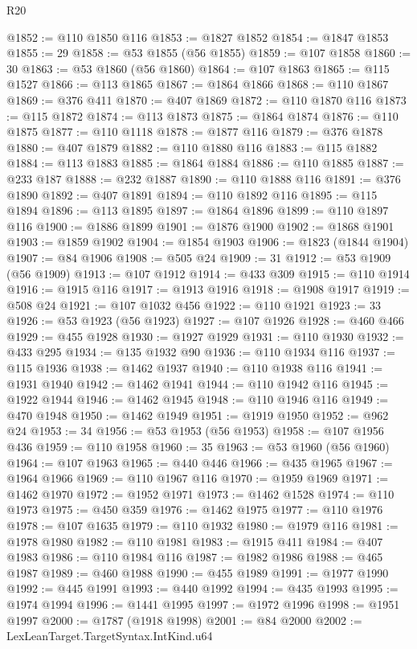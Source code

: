 \begin{lexlean}{R20}
\begin{coremodule}
@1852 := @110 @1850 @116
@1853 := @1827 @1852
@1854 := @1847 @1853
@1855 := 29
@1858 := @53 @1855 (@56 @1855)
@1859 := @107 @1858
@1860 := 30
@1863 := @53 @1860 (@56 @1860)
@1864 := @107 @1863
@1865 := @115 @1527
@1866 := @113 @1865
@1867 := @1864 @1866
@1868 := @110 @1867
@1869 := @376 @411
@1870 := @407 @1869
@1872 := @110 @1870 @116
@1873 := @115 @1872
@1874 := @113 @1873
@1875 := @1864 @1874
@1876 := @110 @1875
@1877 := @110 @1118
@1878 := @1877 @116
@1879 := @376 @1878
@1880 := @407 @1879
@1882 := @110 @1880 @116
@1883 := @115 @1882
@1884 := @113 @1883
@1885 := @1864 @1884
@1886 := @110 @1885
@1887 := @233 @187
@1888 := @232 @1887
@1890 := @110 @1888 @116
@1891 := @376 @1890
@1892 := @407 @1891
@1894 := @110 @1892 @116
@1895 := @115 @1894
@1896 := @113 @1895
@1897 := @1864 @1896
@1899 := @110 @1897 @116
@1900 := @1886 @1899
@1901 := @1876 @1900
@1902 := @1868 @1901
@1903 := @1859 @1902
@1904 := @1854 @1903
@1906 := @1823 (@1844 @1904)
@1907 := @84 @1906
@1908 := @505 @24
@1909 := 31
@1912 := @53 @1909 (@56 @1909)
@1913 := @107 @1912
@1914 := @433 @309
@1915 := @110 @1914
@1916 := @1915 @116
@1917 := @1913 @1916
@1918 := @1908 @1917
@1919 := @508 @24
@1921 := @107 @1032 @456
@1922 := @110 @1921
@1923 := 33
@1926 := @53 @1923 (@56 @1923)
@1927 := @107 @1926
@1928 := @460 @466
@1929 := @455 @1928
@1930 := @1927 @1929
@1931 := @110 @1930
@1932 := @433 @295
@1934 := @135 @1932 @90
@1936 := @110 @1934 @116
@1937 := @115 @1936
@1938 := @1462 @1937
@1940 := @110 @1938 @116
@1941 := @1931 @1940
@1942 := @1462 @1941
@1944 := @110 @1942 @116
@1945 := @1922 @1944
@1946 := @1462 @1945
@1948 := @110 @1946 @116
@1949 := @470 @1948
@1950 := @1462 @1949
@1951 := @1919 @1950
@1952 := @962 @24
@1953 := 34
@1956 := @53 @1953 (@56 @1953)
@1958 := @107 @1956 @436
@1959 := @110 @1958
@1960 := 35
@1963 := @53 @1960 (@56 @1960)
@1964 := @107 @1963
@1965 := @440 @446
@1966 := @435 @1965
@1967 := @1964 @1966
@1969 := @110 @1967 @116
@1970 := @1959 @1969
@1971 := @1462 @1970
@1972 := @1952 @1971
@1973 := @1462 @1528
@1974 := @110 @1973
@1975 := @450 @359
@1976 := @1462 @1975
@1977 := @110 @1976
@1978 := @107 @1635
@1979 := @110 @1932
@1980 := @1979 @116
@1981 := @1978 @1980
@1982 := @110 @1981
@1983 := @1915 @411
@1984 := @407 @1983
@1986 := @110 @1984 @116
@1987 := @1982 @1986
@1988 := @465 @1987
@1989 := @460 @1988
@1990 := @455 @1989
@1991 := @1977 @1990
@1992 := @445 @1991
@1993 := @440 @1992
@1994 := @435 @1993
@1995 := @1974 @1994
@1996 := @1441 @1995
@1997 := @1972 @1996
@1998 := @1951 @1997
@2000 := @1787 (@1918 @1998)
@2001 := @84 @2000
@2002 := LexLeanTarget.TargetSyntax.IntKind.u64

\end{coremodule}
\end{lexlean}
